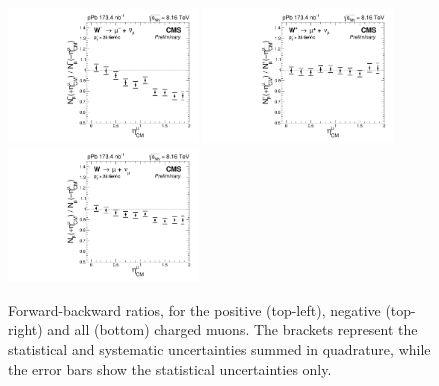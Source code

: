\begin{figure}[htb!]
 \centering
 \includegraphics[width=0.45\textwidth]{Figures/WBoson/Results/DATA/gr_WToMuMi_PA_ForwardBackward_Ratio_EffTnP_Nominal}
 \includegraphics[width=0.45\textwidth]{Figures/WBoson/Results/DATA/gr_WToMuPl_PA_ForwardBackward_Ratio_EffTnP_Nominal}
 \includegraphics[width=0.45\textwidth]{Figures/WBoson/Results/DATA/gr_WToMuInc_PA_ForwardBackward_Ratio_EffTnP_Nominal}
 \caption{Forward-backward ratios, for the positive (top-left), negative (top-right) and all (bottom) charged muons. The brackets represent the statistical and systematic uncertainties summed in quadrature, while the error bars show the statistical uncertainties only.}
 \label{fig:ForwardBackwardRatio_WToMu_PA}
\end{figure}

